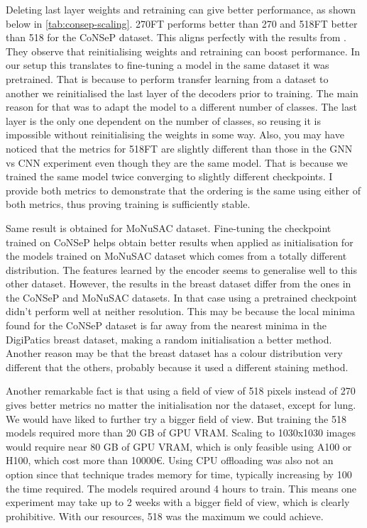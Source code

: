 Deleting last layer weights and retraining can give better performance, as shown below in \autoref{tab:consep-scaling}. 270FT performs better than 270 and 518FT better than 518 for the CoNSeP dataset. This aligns perfectly with the results from \cite{zhou2022fortuitous}. They observe that reinitialising weights and retraining can boost performance. In our setup this translates to fine-tuning a model in the same dataset it was pretrained. That is because to perform transfer learning from a dataset to another we reinitialised the last layer of the decoders prior to training. The main reason for that was to adapt the model to a different number of classes. The last layer is the only one dependent on the number of classes, so reusing it is impossible without reinitialising the weights in some way. Also, you may have noticed that the metrics for 518FT are slightly different than those in the GNN vs CNN experiment even though they are the same model. That is because we trained the same model twice converging to slightly different checkpoints. I provide both metrics to demonstrate that the ordering is the same using either of both metrics, thus proving training is sufficiently stable.

Same result is obtained for MoNuSAC dataset. Fine-tuning the checkpoint trained on CoNSeP helps obtain better results when applied as initialisation for the models trained on MoNuSAC dataset which comes from a totally different distribution. The features learned by the encoder seems to generalise well to this other dataset. However, the results in the breast dataset differ from the ones in the CoNSeP and MoNuSAC datasets. In that case using a pretrained checkpoint didn't perform well at neither resolution. This may be because the local minima found for the CoNSeP dataset is far away from the nearest minima in the DigiPatics breast dataset, making a random initialisation a better method. Another reason may be that the breast dataset has a colour distribution very different that the others, probably because it used a different staining method.

Another remarkable fact is that using a field of view of 518 pixels instead of 270 gives better metrics no matter the initialisation nor the dataset, except for lung. We would have liked to further try a bigger field of view. But training the 518 models required more than 20 GB of GPU VRAM. Scaling to 1030x1030 images would require near 80 GB of GPU VRAM, which is only feasible using A100 or H100, which cost more than 10000€. Using CPU offloading was also not an option since that technique trades memory for time, typically increasing by 100 the time required. The models required around 4 hours to train. This means one experiment may take up to 2 weeks with a bigger field of view, which is clearly prohibitive. With our resources, 518 was the maximum we could achieve.

